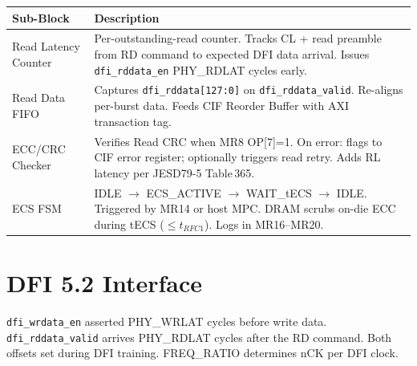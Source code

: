 \documentclass[10pt,a4paper]{article}
\newcommand{\Th}[1]{\cellcolor{thbg}\textbf{\small\color{acc1}#1}}
\newcommand{\RA}{\rowcolor{white}}
\newcommand{\RB}{\rowcolor{altbg}}
\begin{document}
\begin{center}
\begin{tabularx}{\linewidth}{@{} l X @{}}
\toprule
\Th{Sub-Block} & \Th{Description} \\
\midrule
\RA Read Latency Counter & Per-outstanding-read counter. Tracks CL + read preamble from RD
  command to expected DFI data arrival. Issues \texttt{dfi\_rddata\_en} PHY\_RDLAT cycles early. \\
\RB Read Data FIFO & Captures \texttt{dfi\_rddata[127:0]} on \texttt{dfi\_rddata\_valid}.
  Re-aligns per-burst data. Feeds CIF Reorder Buffer with AXI transaction tag. \\
\RA ECC/CRC Checker & Verifies Read CRC when MR8 OP[7]=1. On error: flags to CIF error register;
  optionally triggers read retry. Adds RL latency per JESD79-5 Table\,365. \\
\RB ECS FSM & IDLE $\to$ ECS\_ACTIVE $\to$ WAIT\_tECS $\to$ IDLE. Triggered by MR14 or host
  MPC. DRAM scrubs on-die ECC during tECS ($\leq t_{RFC1}$). Logs in MR16--MR20. \\
\bottomrule
\end{tabularx}
\end{center}

\section{DFI 5.2 Interface}

\texttt{dfi\_wrdata\_en} asserted PHY\_WRLAT cycles before write data.
\texttt{dfi\_rddata\_valid} arrives PHY\_RDLAT cycles after the RD command.
Both offsets set during DFI training. FREQ\_RATIO determines nCK per DFI clock.
\end{document}
